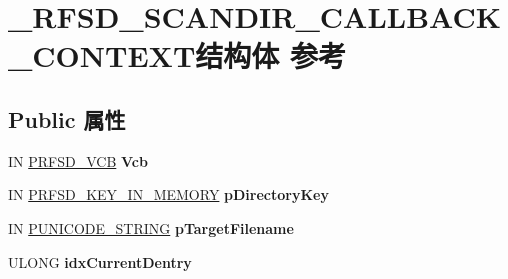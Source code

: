\hypertarget{struct___r_f_s_d___s_c_a_n_d_i_r___c_a_l_l_b_a_c_k___c_o_n_t_e_x_t}{}\section{\+\_\+\+R\+F\+S\+D\+\_\+\+S\+C\+A\+N\+D\+I\+R\+\_\+\+C\+A\+L\+L\+B\+A\+C\+K\+\_\+\+C\+O\+N\+T\+E\+X\+T结构体 参考}
\label{struct___r_f_s_d___s_c_a_n_d_i_r___c_a_l_l_b_a_c_k___c_o_n_t_e_x_t}
\subsection*{Public 属性}
\begin{DoxyCompactItemize}
\item 
\mbox{\label{struct___r_f_s_d___s_c_a_n_d_i_r___c_a_l_l_b_a_c_k___c_o_n_t_e_x_t_a2cac7caef52cccce91e70389aed06f7d}} 
IN \hyperlink{struct___r_f_s_d___v_c_b}{P\+R\+F\+S\+D\+\_\+\+V\+CB} {\bfseries Vcb}
\item 
\mbox{\label{struct___r_f_s_d___s_c_a_n_d_i_r___c_a_l_l_b_a_c_k___c_o_n_t_e_x_t_a8c6488642ade1d26e6ba1c47de58a8ce}} 
IN \hyperlink{structreiserfs__cpu__key}{P\+R\+F\+S\+D\+\_\+\+K\+E\+Y\+\_\+\+I\+N\+\_\+\+M\+E\+M\+O\+RY} {\bfseries p\+Directory\+Key}
\item 
\mbox{\label{struct___r_f_s_d___s_c_a_n_d_i_r___c_a_l_l_b_a_c_k___c_o_n_t_e_x_t_ad1cf7c1b9bea68303690a7de48c23fd6}} 
IN \hyperlink{struct___u_n_i_c_o_d_e___s_t_r_i_n_g}{P\+U\+N\+I\+C\+O\+D\+E\+\_\+\+S\+T\+R\+I\+NG} {\bfseries p\+Target\+Filename}
\item 
\mbox{\label{struct___r_f_s_d___s_c_a_n_d_i_r___c_a_l_l_b_a_c_k___c_o_n_t_e_x_t_a0818de37a81757ea0d5b5abafb56f805}} 
U\+L\+O\+NG {\bfseries idx\+Current\+Dentry}
\item 
\mbox{\label{struct___r_f_s_d___s_c_a_n_d_i_r___c_a_l_l_b_a_c_k___c_o_n_t_e_x_t_a255416463b132cad7be4fc2b5b33acb1}} 

\end{DoxyCompactItemize}
